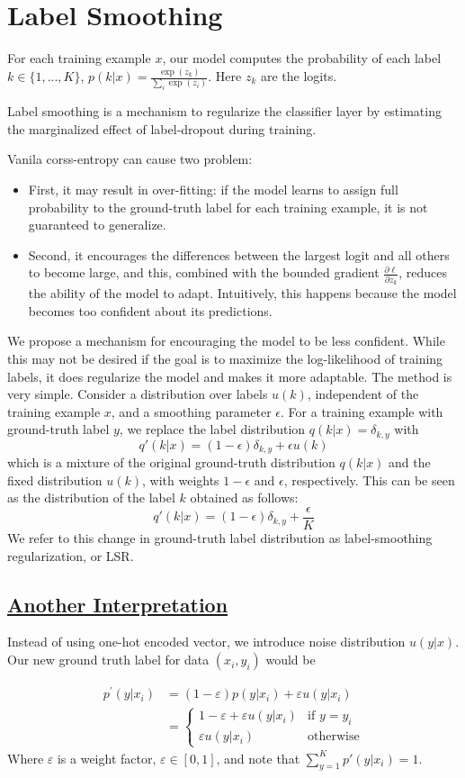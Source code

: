 \section{Label Smoothing}
For each training example $x$, our model computes the probability of each label $k\in \{1,...,K\}$, $p(k|x) = \frac{\exp(z_k)}{\sum_i \exp(z_i)}$. Here $z_k$ are the logits.

Label smoothing is a mechanism to regularize the classifier layer by estimating the marginalized effect of label-dropout during training.

Vanila corss-entropy can cause two problem: 
\begin{itemize}
    \item First, it may result in over-fitting: if the model learns to assign full probability to the ground-truth label for each training example, it is not guaranteed to generalize. 
    \item Second, it encourages the differences between the largest logit and all others to become large, and this, combined with the bounded gradient $\frac{\partial \ell}{\partial z_k}$, reduces the ability of the model to adapt. Intuitively, this happens because the model becomes too confident about its predictions. 
\end{itemize}
We propose a mechanism for encouraging the model to be less confident. While this may not be desired if the goal is to maximize the log-likelihood of training labels, it does regularize the model and makes it more adaptable. The method is very simple. Consider a distribution over labels $u(k)$, independent of the training example $x$, and a smoothing parameter $\epsilon$. For a training example with ground-truth label $y$, we replace the label distribution $q(k|x) = \delta_{k,y}$ with
$$q'(k|x) = (1-\epsilon)\delta_{k,y}+\epsilon u(k)$$
which is a mixture of the original ground-truth distribution $q(k|x)$ and the fixed distribution $u(k)$, with weights $1-\epsilon$ and $\epsilon$, respectively. This can be seen as the distribution of the label $k$ obtained as follows: 
$$q'(k|x) = (1-\epsilon)\delta_{k,y}+\frac{\epsilon}{K} $$
We refer to this change in ground-truth label distribution as label-smoothing regularization, or LSR.

\subsection{\href{https://leimao.github.io/blog/Label-Smoothing/}{Another Interpretation}}

Instead of using one-hot encoded vector, we introduce noise distribution $u(y|x)$. Our new ground truth label for data $(x_i,y_i)$ would be

\begin{align*}
p^{\prime}(y|x_i) &= (1-\varepsilon) p(y|x_i) + \varepsilon u(y|x_i) \\
&=
\begin{cases}
    1 - \varepsilon + \varepsilon u(y|x_i) & \text{if } y = y_i \\
    \varepsilon u(y|x_i) & \text{otherwise}
\end{cases}
\end{align*}
Where $\varepsilon$ is a weight factor, $\varepsilon\in [0,1]$, and note that $\sum_{y=1}^{K}p'(y|x_i)=1$.
